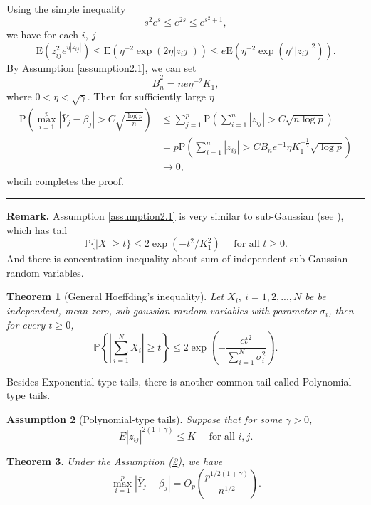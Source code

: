 \documentclass[12pt]{article}
\numberwithin{equation}{section}
\newtheorem{theorem}{Theorem}[section]
\newtheorem{assumption}[theorem]{Assumption}
\newenvironment{proof}{{\bf Proof:}}{\hfill\rule{2mm}{2mm}}
\begin{document}
\begin{proof}
	Using the simple inequality 
	$$
	s^{2} e^{s} \leq e^{2 s}\leq e^{s^2+1},
	$$
	we have for each $i,\ j$
	$$
	\mathrm{E}\left(z_{ij}^2e^{\eta |z_{ij}|}\right)\leq \mathrm{E}\left(\eta^{-2}\exp(2\eta|z_ij|)\right)\leq e\mathrm{E}\left(\eta^{-2}\exp(\eta^2|z_ij|^2)\right).
	$$
	By Assumption \ref{assumption2.1}, we can set 
	$$
	\bar{B}_{n}^2=ne\eta^{-2} K_1,
	$$
	where $0<\eta<\sqrt{\gamma}$. Then for sufficiently large $\eta$
	\begin{align*}
	\mathrm{P}\left(\max _{i=1}^{p}\left|\bar Y_{j}-\beta_{j}\right|>C\sqrt{\frac{\log p}{n}}\right)&\leq \sum_{j=1}^p\mathrm{P}\left(\sum_{i=1}^n|z_{ij}|>C\sqrt{n\log p}\right)\\
	&=p\mathrm{P}\left(\sum_{i=1}^n|z_{ij}|>C\bar{B}_ne^{-1}\eta K_1^{-\frac{1}{2}}\sqrt{\log p}\right)\\
	&\to 0,
	\end{align*}
	whcih completes the proof.
\end{proof}\newline
\textbf{Remark.} Assumption \ref{assumption2.1} is very similar to sub-Gaussian (see \citet{vershynin2018high}), which has tail
\begin{equation}\label{2.4}
\mathbb{P}\{|X| \geq t\} \leq 2 \exp \left(-t^{2} / K_{1}^{2}\right) \quad \text { for all } t \geq 0.
\end{equation}
And there is concentration inequality about sum of independent sub-Gaussian random variables.
\begin{theorem}[General Hoeffding’s inequality]
	Let $X_i,\ i=1,2,...,N$ be be independent, mean zero, sub-gaussian random variables with parameter $\sigma_i$, then for every $t\geq 0$,
	\begin{equation}
	\mathbb{P}\left\{\left|\sum_{i=1}^{N} X_{i}\right| \geq t\right\} \leq 2 \exp \left(-\frac{c t^{2}}{\sum_{i=1}^{N}\sigma_i^2}\right).
	\end{equation}
\end{theorem}
Besides Exponential-type tails, there is another common tail called Polynomial-type tails.
\begin{assumption}[Polynomial-type tails]\label{assumption2}
	Suppose that for some $\gamma>0$, 
	\begin{equation}
	E\left|z_{i j}\right|^{2(1+\gamma)} \leq K \quad \text { for all } i, j.
	\end{equation}
\end{assumption}
\begin{theorem}
	Under the Assumption (\ref{assumption2}), we have
	\begin{equation}
	\max _{i=1}^{p}\left|\bar Y_{j}-\beta_{j}\right| = O_p\left(\frac{p^{1/2(1+\gamma)}}{n^{1/2}}\right).
	\end{equation}
\end{theorem}
\end{document}

